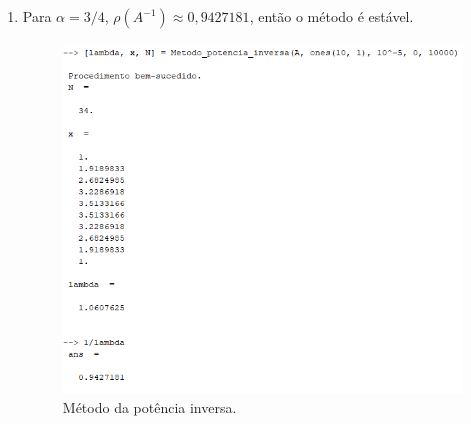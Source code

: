 \documentclass[11pt]{article}
\begin{document}
\begin{enumerate}
\begin{enumerate}
    \item Para $\alpha = 3/4$, $\rho(A^{-1})\approx0,9427181$, então o método é estável.

\begin{figure}[H]
    \centering
    \includegraphics[]{5-c}
    \caption{Método da potência inversa.}
\end{figure}
\end{enumerate}

\end{enumerate}
\end{document}

